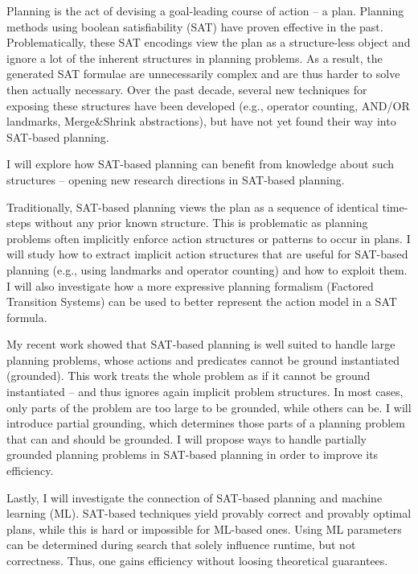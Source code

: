 Planning is the act of devising a goal-leading course of action -- a plan.
Planning methods using boolean satisfiability (SAT) have proven effective in the past.
Problematically, these SAT encodings view the plan as a structure-less object and ignore a lot of the inherent structures in planning problems.
As a result, the generated SAT formulae are unnecessarily complex and are thus harder to solve then actually necessary.
Over the past decade, several new techniques for exposing these structures have been developed (e.g., operator counting, AND/OR landmarks, Merge\&Shrink abstractions), but have not yet found their way into SAT-based planning.

I will explore how SAT-based planning can benefit from knowledge about such structures -- opening new research directions in SAT-based planning.



Traditionally, SAT-based planning views the plan as a sequence of identical time-steps without any prior known structure.
This is problematic as planning problems often implicitly enforce action structures or patterns to occur in plans.
I will study how to extract implicit action structures that are useful for SAT-based planning (e.g., using landmarks and operator counting) and how to exploit them.
I will also investigate how a more expressive planning formalism (Factored Transition Systems) can be used to better represent the action model in a SAT formula.

My recent work showed that SAT-based planning is well suited to handle large planning problems, whose actions and predicates cannot be ground instantiated (grounded).
This work treats the whole problem as if it cannot be ground instantiated -- and thus ignores again implicit problem structures.
In most cases, only parts of the problem are too large to be grounded, while others can be.
I will introduce partial grounding, which determines those parts of a planning problem that can and should be grounded.
I will propose ways to handle partially grounded planning problems in SAT-based planning in order to improve its efficiency.


Lastly, I will investigate the connection of SAT-based planning and machine learning (ML).
SAT-based techniques yield provably correct and provably optimal plans, while this is hard or impossible for ML-based ones.
Using ML parameters can be determined during search that solely influence runtime, but not correctness.
Thus, one gains efficiency without loosing theoretical guarantees.

